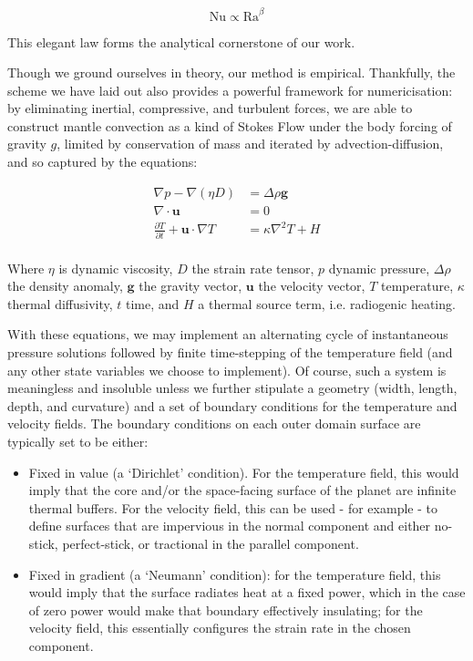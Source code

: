 \documentclass[a4paper,11pt,oneside]{book}
\begin{document}
\begin{equation}
\mathrm{Nu} \propto \mathrm{Ra}^{\beta}
\end{equation}

This elegant law forms the analytical cornerstone of our work.

Though we ground ourselves in theory, our method is empirical. Thankfully, the scheme we have laid out also provides a powerful framework for numericisation: by eliminating inertial, compressive, and turbulent forces, we are able to construct mantle convection as a kind of Stokes Flow under the body forcing of gravity $g$, limited by conservation of mass and iterated by advection-diffusion, and so captured by the equations:

\begin{align*}
\nabla p - \nabla \left( \eta D \right) &= \Delta \rho \mathbf{g} \\
\nabla \cdot \mathbf{u} &= 0 \\
\frac{\partial T}{\partial t} + \mathbf{u} \cdot \nabla T &= \kappa \nabla^2 T + H \\
\end{align*}

Where $\eta$ is dynamic viscosity, $D$ the strain rate tensor, $p$ dynamic pressure, $\Delta\rho$ the density anomaly, $\mathbf{g}$ the gravity vector, $\mathbf{u}$ the velocity vector, $T$ temperature, $\kappa$ thermal diffusivity, $t$ time, and $H$ a thermal source term, i.e. radiogenic heating.

With these equations, we may implement an alternating cycle of instantaneous pressure solutions followed by finite time-stepping of the temperature field (and any other state variables we choose to implement). Of course, such a system is meaningless and insoluble unless we further stipulate a geometry (width, length, depth, and curvature) and a set of boundary conditions for the temperature and velocity fields. The boundary conditions on each outer domain surface are typically set to be either:

\begin{itemize}
\item Fixed in value (a `Dirichlet' condition). For the temperature field, this would imply that the core and/or the space-facing surface of the planet are infinite thermal buffers. For the velocity field, this can be used - for example - to define surfaces that are impervious in the normal component and either no-stick, perfect-stick, or tractional in the parallel component.
\item Fixed in gradient (a `Neumann' condition): for the temperature field, this would imply that the surface radiates heat at a fixed power, which in the case of zero power would make that boundary effectively insulating; for the velocity field, this essentially configures the strain rate in the chosen component.
\end{itemize}
\end{document}
